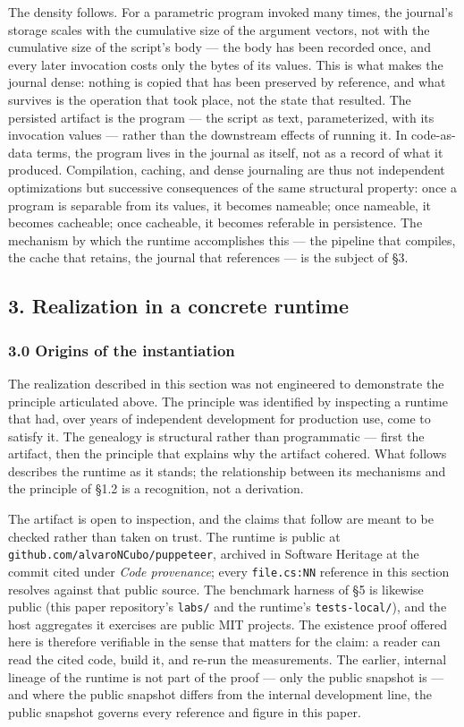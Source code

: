 \documentclass[
]{article}
\let\origtexttt\texttt%
\renewcommand{\texttt}[1]{\origtexttt{\seqsplit{#1}}}%
\let\texttt\origtexttt%
\begin{document}
The density follows. For a parametric program invoked many times, the
journal's storage scales with the cumulative size of the argument
vectors, not with the cumulative size of the script's body --- the body
has been recorded once, and every later invocation costs only the bytes
of its values. This is what makes the journal dense: nothing is copied
that has been preserved by reference, and what survives is the operation
that took place, not the state that resulted. The persisted artifact is
the program --- the script as text, parameterized, with its invocation
values --- rather than the downstream effects of running it. In
code-as-data terms, the program lives in the journal as itself, not as a
record of what it produced. Compilation, caching, and dense journaling
are thus not independent optimizations but successive consequences of
the same structural property: once a program is separable from its
values, it becomes nameable; once nameable, it becomes cacheable; once
cacheable, it becomes referable in persistence. The mechanism by which
the runtime accomplishes this --- the pipeline that compiles, the cache
that retains, the journal that references --- is the subject of §3.

\subsection{3. Realization in a concrete
runtime}\label{realization-in-a-concrete-runtime}

\subsubsection{3.0 Origins of the
instantiation}\label{origins-of-the-instantiation}

The realization described in this section was not engineered to
demonstrate the principle articulated above. The principle was
identified by inspecting a runtime that had, over years of independent
development for production use, come to satisfy it. The genealogy is
structural rather than programmatic --- first the artifact, then the
principle that explains why the artifact cohered. What follows describes
the runtime as it stands; the relationship between its mechanisms and
the principle of §1.2 is a recognition, not a derivation.

The artifact is open to inspection, and the claims that follow are meant
to be checked rather than taken on trust. The runtime is public at
\texttt{github.com/alvaroNCubo/puppeteer}, archived in Software Heritage
at the commit cited under \emph{Code provenance}; every
\texttt{file.cs:NN} reference in this section resolves against that
public source. The benchmark harness of §5 is likewise public (this
paper repository's \texttt{labs/} and the runtime's
\texttt{tests-local/}), and the host aggregates it exercises are public
MIT projects. The existence proof offered here is therefore verifiable
in the sense that matters for the claim: a reader can read the cited
code, build it, and re-run the measurements. The earlier, internal
lineage of the runtime is not part of the proof --- only the public
snapshot is --- and where the public snapshot differs from the internal
development line, the public snapshot governs every reference and figure
in this paper.
\end{document}
